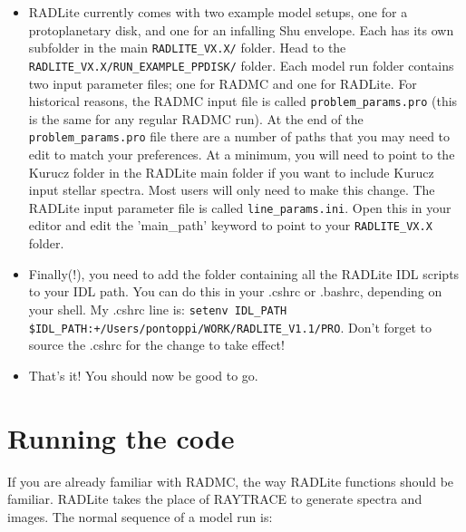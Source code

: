 \documentclass[11pt]{article}
\begin{document}
\begin{itemize}
\item RADLite currently comes with two example model setups, one for a protoplanetary disk, and one for an infalling Shu envelope.
Each has its own subfolder in the main {\tt RADLITE\_VX.X/} folder. Head to the {\tt RADLITE\_VX.X/RUN\_EXAMPLE\_PPDISK/} folder. Each model 
run folder contains two input parameter files; one for RADMC and one for RADLite. For historical reasons, the RADMC input file is called {\tt problem\_params.pro} (this
is the same for any regular RADMC run). At the end of the {\tt problem\_params.pro} file there are a number of paths that you may need to edit to match your
preferences. At a minimum, you will need to point to the Kurucz folder in the RADLite main folder if you want to include Kurucz input stellar spectra. Most users
will only need to make this change. The RADLite input parameter file is called {\tt line\_params.ini}. Open this in your editor and edit the 'main\_path' keyword to point to
your {\tt RADLITE\_VX.X} folder. 

\item Finally(!), you need to add the folder containing all the RADLite IDL scripts to your IDL path. You can do this in your .cshrc or .bashrc, depending on
your shell. My .cshrc line is: 
{\tt setenv IDL\_PATH     \$IDL\_PATH{:}+/Users/pontoppi/WORK/RADLITE\_V1.1/PRO}.
Don't forget to source the .cshrc for the change to take effect!

\item That's it! You should now be good to go. 

\end{itemize}

\section{Running the code}

If you are already familiar with RADMC, the way RADLite functions should be familiar. RADLite takes the place of RAYTRACE to generate spectra and images. 
The normal sequence of a model run is:
\end{document}
